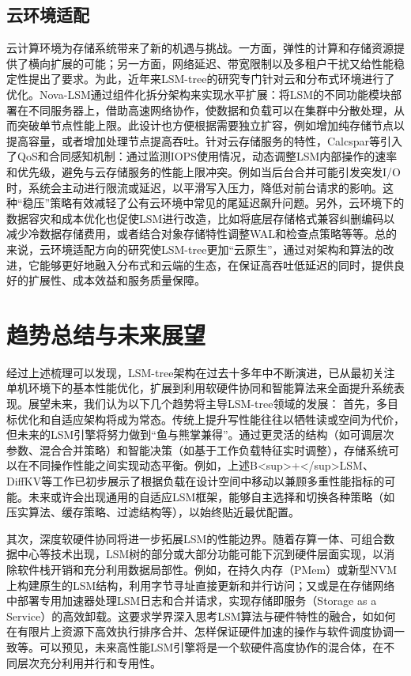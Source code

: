 \documentclass[lang=cn,11pt,a4paper]{elegantpaper}
\begin{document}
\subsection{云环境适配}
云计算环境为存储系统带来了新的机遇与挑战。一方面，弹性的计算和存储资源提供了横向扩展的可能；另一方面，网络延迟、带宽限制以及多租户干扰又给性能稳定性提出了要求。为此，近年来LSM-tree的研究专门针对云和分布式环境进行了优化。Nova-LSM通过组件化拆分架构来实现水平扩展：将LSM的不同功能模块部署在不同服务器上，借助高速网络协作，使数据和负载可以在集群中分散处理，从而突破单节点性能上限。此设计也方便根据需要独立扩容，例如增加纯存储节点以提高容量，或者增加处理节点提高吞吐。针对云存储服务的特性，Calcspar等引入了QoS和合同感知机制：通过监测IOPS使用情况，动态调整LSM内部操作的速率和优先级，避免与云存储服务的性能上限冲突。例如当后台合并可能引发突发I/O时，系统会主动进行限流或延迟，以平滑写入压力，降低对前台请求的影响。这种“稳压”策略有效减轻了公有云环境中常见的尾延迟飙升问题。另外，云环境下的数据容灾和成本优化也促使LSM进行改造，比如将底层存储格式兼容纠删编码以减少冷数据存储费用，或者结合对象存储特性调整WAL和检查点策略等等。总的来说，云环境适配方向的研究使LSM-tree更加“云原生”，通过对架构和算法的改进，它能够更好地融入分布式和云端的生态，在保证高吞吐低延迟的同时，提供良好的扩展性、成本效益和服务质量保障。

\section{趋势总结与未来展望}

经过上述梳理可以发现，LSM-tree架构在过去十多年中不断演进，已从最初关注单机环境下的基本性能优化，扩展到利用软硬件协同和智能算法来全面提升系统表现。展望未来，我们认为以下几个趋势将主导LSM-tree领域的发展： 首先，多目标优化和自适应架构将成为常态。传统上提升写性能往往以牺牲读或空间为代价，但未来的LSM引擎将努力做到“鱼与熊掌兼得”。通过更灵活的结构（如可调层次参数、混合合并策略）和智能决策（如基于工作负载特征实时调整），存储系统可以在不同操作性能之间实现动态平衡。例如，上述B<sup>+</sup>LSM、DiffKV等工作已初步展示了根据负载在设计空间中移动以兼顾多重性能指标的可能。未来或许会出现通用的自适应LSM框架，能够自主选择和切换各种策略（如压实算法、缓存策略、过滤结构等），以始终贴近最优配置。 

其次，深度软硬件协同将进一步拓展LSM的性能边界。随着存算一体、可组合数据中心等技术出现，LSM树的部分或大部分功能可能下沉到硬件层面实现，以消除软件栈开销和充分利用数据局部性。例如，在持久内存（PMem）或新型NVM上构建原生的LSM结构，利用字节寻址直接更新和并行访问；又或是在存储网络中部署专用加速器处理LSM日志和合并请求，实现存储即服务（Storage as a Service）的高效卸载。这要求学界深入思考LSM算法与硬件特性的融合，如如何在有限片上资源下高效执行排序合并、怎样保证硬件加速的操作与软件调度协调一致等。可以预见，未来高性能LSM引擎将是一个软硬件高度协作的混合体，在不同层次充分利用并行和专用性。 
\end{document}
